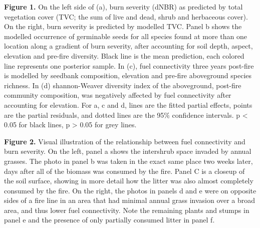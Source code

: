 \documentclass[
  12pt,
]{article}
\begin{document}
\textbf{Figure 1.} On the left side of (a), burn severity (dNBR) as
predicted by total vegetation cover (TVC; the sum of live and dead,
shrub and herbaceous cover). On the right, burn severity is predicted by
modelled TVC. Panel b shows the modelled occurrence of germinable seeds
for all species found at more than one location along a gradient of burn
severity, after accounting for soil depth, aspect, elevation and
pre-fire diversity. Black line is the mean prediction, each colored line
represents one posterior sample. In (c), fuel connectivity three years
post-fire is modelled by seedbank composition, elevation and pre-fire
aboveground species richness. In (d) shannon-Weaver diversity index of
the aboveground, post-fire community composition, was negatively
affected by fuel connectivity after accounting for elevation. For a, c
and d, lines are the fitted partial effects, points are the partial
residuals, and dotted lines are the 95\% confidence intervals. p
\textless{} 0.05 for black lines, p \textgreater{} 0.05 for grey lines.

\textbf{Figure 2.} Visual illustration of the relationship between fuel
connectivity and burn severity. On the left, panel a shows the
intershrub space invaded by annual grasses. The photo in panel b was
taken in the exact same place two weeks later, days after all of the
biomass was consumed by the fire. Panel C is a closeup of the soil
surface, showing in more detail how the litter was also almost
completely consumed by the fire. On the right, the photos in panels d
and e were on opposite sides of a fire line in an area that had minimal
annual grass invasion over a broad area, and thus lower fuel
connectivity. Note the remaining plants and stumps in panel e and the
presence of only partially consumed litter in panel f.

\newpage
\end{document}

